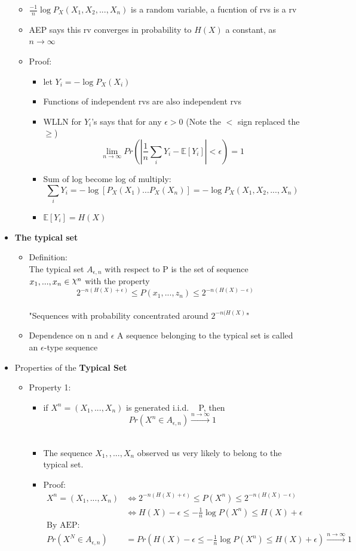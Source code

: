 \documentclass[12pt]{article}
\DeclareRobustCommand{\rchi}{{\mathpalette\irchi\relax}}
\newcommand{\irchi}[2]{\raisebox{\depth}{$#1\chi$}} %
\begin{document}
\begin{itemize}
\begin{itemize}
\item $\frac{-1}{n} \log P_X(X_1,X_2,...,X_n)$ is a random variable, a fucntion of rvs is a rv
\item AEP says this rv converges in probability to $H(X)$ a constant, as $n \rightarrow \infty$
\item Proof:
\begin{itemize}
\item let $Y_i = - \log P_X(X_i)$
\item Functions of independent rvs are also independent rvs
\item WLLN for $Y_i$'s says that for any $\epsilon > 0$ (Note the $<$ sign replaced the $\ge$)
$$\lim_{n \rightarrow \infty} Pr(|\frac{1}{n}\sum_i Y_i - \mathbb{E}[Y_i] | < \epsilon) = 1 $$
\item Sum of log become log of multiply:
$$\sum_i Y_i = -\log [P_X(X_1)...P_X(X_n)] = -\log P_X(X_1,X_2,...,X_n)$$ 
\item $\mathbb{E}[Y_i] = H(X)$
\end{itemize}

\end{itemize}
\item \textbf{The typical set} 
\begin{itemize}
\item Definition: \\
The typical set $ A_{ \epsilon , n } $ with respect to P is the set of sequence ${x_1,...,x_n} \in \rchi ^n$ with the property
$$2^{-n(H(X)+\epsilon)} \le P(x_1,...,z_n) \le 2^{-n(H(X)-\epsilon)}$$\\
"Sequences with probability concentrated around $2^{-n(H(X)}$"
\item Dependence on n and $\epsilon$
A sequence belonging to the typical set is called an $\epsilon $-type sequence 


\end{itemize}
\item Properties of the \textbf{Typical Set}
\begin{itemize}
\item Property 1: 
\begin{itemize}
\item if $X^n = (X_1,...,X_n)$ is generated i.i.d. ~ P, then 
$$ Pr(X^n \in A_{\epsilon,n}) \xrightarrow{n\rightarrow \infty} 1$$\\
\item The sequence $X_1,,...,X_n$ observed us very likely to belong to the typical set.
\item Proof:
\begin{align*}
X^n = (X_1,...,X_n) &\Leftrightarrow 2^{-n(H(X)+\epsilon)} \le P(X^n) \le 2^{-n(H(X)-\epsilon)} \\
&\Leftrightarrow H(X)-\epsilon \le -\frac{1}{n} \log P(X^n) \le H(X)+\epsilon \\
\textrm{By AEP:} \\
Pr(X^N \in A_{\epsilon,n}) &= Pr\left(H(X)-\epsilon \le -\frac{1}{n} \log P(X^n) \le H(X)+\epsilon \right) \xrightarrow{n\rightarrow \infty} 1
\end{align*}


\end{itemize}
\end{itemize}
\end{itemize}
\end{document}
